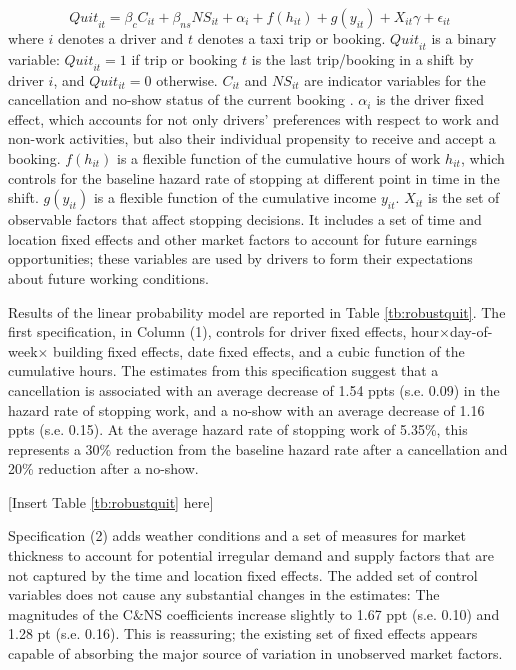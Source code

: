 \documentclass[reviewmode,AEJ]{AEA}
\begin{document}
\begin{equation}
\label{eq:quit}
{Quit}_{it} = \beta_{c}C_{it} + \beta_{ns} {NS}_{it} + \alpha_i +  f(h_{it}) + g(y_{it}) + X_{it}\gamma  +  \epsilon_{it}
\end{equation}
where $i$ denotes a driver and $t$ denotes a taxi trip or booking. ${Quit}_{it}$ is a binary
variable: ${Quit}_{it} = 1$ if trip or booking $t$ is the last trip/booking in a shift by driver $i$,
and $Quit_{it} = 0$ otherwise. $C_{it}$ and ${NS}_{it}$ are indicator variables for
the cancellation and no-show status of the current booking%
. $\alpha_i$ is the driver fixed effect, which accounts for not only drivers' 
preferences with respect to work and non-work activities, but also their individual propensity to receive 
and accept a booking. 
$f(h_{it})$ is a flexible function of the cumulative hours of work $h_{it}$, which controls for the baseline 
hazard rate of stopping at different point in time in the shift. $g(y_{it})$ is a flexible function 
of the cumulative income $y_{it}$.
$X_{it}$ is the set of observable factors that affect stopping decisions.  
It includes a set of time and location fixed effects and other market factors to account for 
future earnings opportunities; these variables are used by drivers to form their expectations 
about future working conditions.


Results of the linear probability model are reported in Table \ref{tb:robustquit}. 
The first specification, in Column (1), controls for driver fixed effects, hour\(\times\)day-of-week\(\times\) building fixed effects, date fixed effects, and a cubic function of the cumulative hours.
The estimates from this specification suggest that a cancellation is associated with an
average decrease of 1.54 ppts (s.e. 0.09) in the hazard rate of stopping work, and a no-show with an average decrease
of 1.16 ppts (s.e. 0.15). At the average hazard rate of stopping work of 5.35\%, this represents a 30\% reduction from the baseline hazard rate after a cancellation and 20\% reduction after a no-show.

\begin{center}
	[Insert Table \ref{tb:robustquit} here]
\end{center}

Specification (2) adds weather conditions and a set of measures for market thickness to account for potential irregular demand and supply factors that are not captured by the time and location fixed effects. The added set of control variables does not cause any substantial changes in the estimates: The magnitudes of the C\&NS coefficients increase slightly to 1.67 ppt (s.e. 0.10) and 1.28 pt (s.e. 0.16). This is reassuring; the existing set of fixed effects appears capable of absorbing the major source of variation in unobserved market factors.
\end{document}
